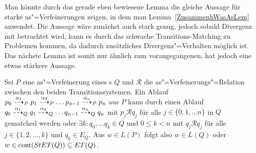 Man könnte durch das gerade eben bewiesene Lemma die gleiche Aussage für starke
as"=Verfeinerungen zeigen, in dem man Lemma~\ref{ZusammenhWasAsLem} anwendet.
Die Aussage wäre zunächst auch stark genug, jedoch sobald Divergenz mit
betrachtet wird, kann es durch das schwache Transitions-Matching zu Problemen
kommen, da dadurch zusätzliches Divergenz"=Verhalten möglich ist. Das nächste
Lemma ist somit nur ähnlich zum vorangegangenen, hat jedoch eine etwas
stärkere Aussage.

\begin{Lem}
  \label{AblaefeVerfSpezLem}
  Sei $P$ eine as"=Verfeinerung eines \MEIO{}s $Q$ und $\mathcal{R}$ die
  as"=Verfeinerungs"=Relation zwischen den beiden Transitionssystemen. Ein
  Ablauf $p_0 \may[\alpha _1]_P p_1 \may[\alpha _2]_P \dots p_{n-1} \may[\alpha
  _n]_P p_n$ aus $P$ kann durch einen Ablauf $q_0 \may[\alpha _1]_Q q_1
  \may[\alpha _2]_Q \dots q_{n-1} \may[\alpha _n]_Q q_n$ mit $p_j \mathcal{R}
  q_j$ für alle $j\in\{0,1,\dots n\}$ in $Q$ gematched werden oder $\exists k:
  q_0,\dots q_k\in Q$ und $0 \leq k < n$ mit $q_j \mathcal{R} q_j$ für alle $j
  \in \{1,2,\dots , k\}$ und $q_k\in E_Q$. Aus $w\in L(P)$ folgt also $w\in
  L(Q)$ oder $w\in\mathrm{cont} (StET (Q))\subseteq ET (Q)$.
\end{Lem}
